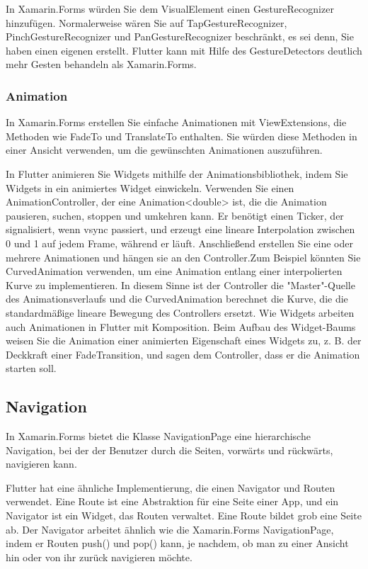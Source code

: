 In Xamarin.Forms würden Sie dem VisualElement einen GestureRecognizer hinzufügen. Normalerweise wären Sie auf TapGestureRecognizer, PinchGestureRecognizer und PanGestureRecognizer beschränkt, es sei denn, Sie haben einen eigenen erstellt. Flutter kann mit Hilfe des GestureDetectors deutlich mehr Gesten behandeln als Xamarin.Forms.

\subsubsection{Animation}
In Xamarin.Forms erstellen Sie einfache Animationen mit ViewExtensions, die Methoden wie FadeTo und TranslateTo enthalten. Sie würden diese Methoden in einer Ansicht verwenden, um die gewünschten Animationen auszuführen.

In Flutter animieren Sie Widgets mithilfe der Animationsbibliothek, indem Sie Widgets in ein animiertes Widget einwickeln. Verwenden Sie einen AnimationController, der eine Animation<double> ist, die die Animation pausieren, suchen, stoppen und umkehren kann. Er benötigt einen Ticker, der signalisiert, wenn vsync passiert, und erzeugt eine lineare Interpolation zwischen 0 und 1 auf jedem Frame, während er läuft. Anschließend erstellen Sie eine oder mehrere Animationen und hängen sie an den Controller.Zum Beispiel könnten Sie CurvedAnimation verwenden, um eine Animation entlang einer interpolierten Kurve zu implementieren. In diesem Sinne ist der Controller die "Master"-Quelle des Animationsverlaufs und die CurvedAnimation berechnet die Kurve, die die standardmäßige lineare Bewegung des Controllers ersetzt. Wie Widgets arbeiten auch Animationen in Flutter mit Komposition.
Beim Aufbau des Widget-Baums weisen Sie die Animation einer animierten Eigenschaft eines Widgets zu, z. B. der Deckkraft einer FadeTransition, und sagen dem Controller, dass er die Animation starten soll.

\subsection{Navigation}
In Xamarin.Forms bietet die Klasse NavigationPage eine hierarchische Navigation, bei der der Benutzer durch die Seiten, vorwärts und rückwärts, navigieren kann.

Flutter hat eine ähnliche Implementierung, die einen Navigator und Routen verwendet. Eine Route ist eine Abstraktion für eine Seite einer App, und ein Navigator ist ein Widget, das Routen verwaltet. Eine Route bildet grob eine Seite ab. Der Navigator arbeitet ähnlich wie die Xamarin.Forms NavigationPage, indem er Routen push() und pop() kann, je nachdem, ob man zu einer Ansicht hin oder von ihr zurück navigieren möchte.

